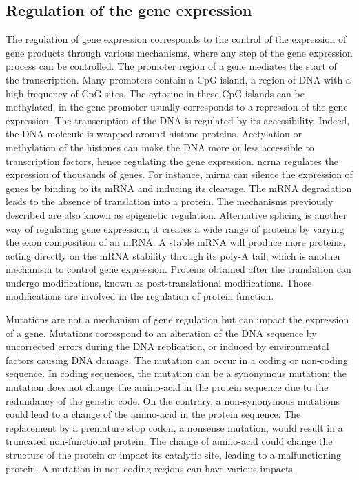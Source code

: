 \documentclass[../main.tex]{subfiles}
\begin{document}
 \subsection{Regulation of the gene expression}
	 The regulation of gene expression corresponds to the control of the expression of gene products through various mechanisms,
	 where any step of the gene expression process can be controlled.
	 The promoter region of a gene mediates the start of the transcription.
	 Many promoters contain a CpG island, a region of DNA with a high frequency of CpG sites.
	 The cytosine in these CpG islands can be methylated,  in the gene promoter usually corresponds to a repression of the gene expression.
	 The transcription of the DNA is regulated by its accessibility.
	 Indeed, the DNA molecule is wrapped around histone proteins.
	 Acetylation or methylation of the histones can make the DNA more or less accessible to transcription factors, hence regulating the gene expression.
	 \Gls{ncrna} regulates the expression of thousands of genes.
	 For instance, \gls{mirna} can silence the expression of genes by binding to its mRNA and inducing its cleavage.
	 The mRNA degradation leads to the absence of translation into a protein.
	 The mechanisms previously described are also known as epigenetic regulation.
	 Alternative splicing is another way of regulating gene expression; it creates a wide range of proteins by varying the exon composition of an mRNA\@.
	 A stable mRNA will produce more proteins, acting directly on the mRNA stability through its poly-A tail, which is another mechanism to control gene expression.
	 Proteins obtained after the translation can undergo modifications, known as post-translational modifications.
	 Those modifications are involved in the regulation of protein function.

	 Mutations are not a mechanism of gene regulation but can impact the expression of a gene.
	 Mutations correspond to an alteration of the DNA sequence by uncorrected errors during the DNA replication, or induced by environmental factors causing DNA damage.
	 The mutation can occur in a coding or non-coding sequence.
	 In coding sequences, the mutation can be a synonymous mutation: the mutation does not change the amino-acid in the protein sequence due to the redundancy of the genetic code.
	 On the contrary, a non-synonymous mutations could lead to a change of the amino-acid in the protein sequence.
	 The replacement by a premature stop codon, a nonsense mutation, would result in a truncated non-functional protein.
	 The change of amino-acid could change the structure of the protein or impact its catalytic site, leading to a malfunctioning protein.
	 A mutation in non-coding regions can have various impacts.
\end{document}
